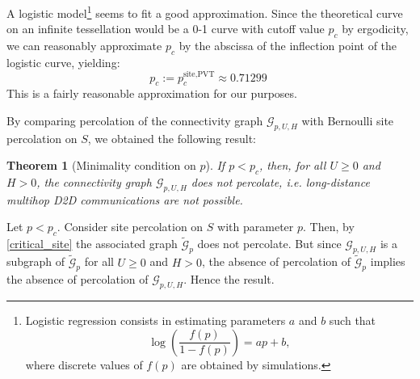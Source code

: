 \documentclass[conference]{IEEEtran}
\newtheorem{theorem}{Theorem}
\begin{document}
A logistic model\footnote{Logistic regression consists in  estimating 
parameters $a$ and $b$ such that 
\begin{equation*}
\log\left (\frac{f(p)}{1-f(p)}\right)=ap+b, 
\end{equation*} where discrete values of $f(p)$ are obtained by simulations.} %
seems to fit a good approximation.
Since the theoretical curve on an infinite tessellation would be a 0-1 curve with cutoff value $p_c$ by ergodicity, we can reasonably approximate $p_c$ by the abscissa of the inflection point of the logistic curve, yielding:   %
\begin{equation}
\label{e.pc}
p_c:=p_{c}^{\text{site,PVT}} \approx 0.71299 \;  %
\end{equation}
This is a fairly reasonable approximation for our purposes.





\indent %
By comparing percolation of the connectivity graph $\mathcal{G}_{p,U,H}$ with Bernoulli site percolation on $S$, we obtained the following result: \\
\begin{theorem}[Minimality condition on $p$] \label{minimality_theorem} If %
$p<p_c$, then, for all $U \geq 0$ and $H>0$, the connectivity graph $\mathcal{G}_{p,U,H}$ does not percolate, i.e. long-distance multihop D2D communications are not possible.
\end{theorem}
\begin{IEEEproof} 
Let $p < p_c$.
Consider site percolation on $S$ with parameter $p$. Then, by \eqref{critical_site} the associated graph $\tilde{\mathcal{G}}_{p}$ does not percolate. But since $\mathcal{G}_{p,U,H}$ is a subgraph of $\tilde{\mathcal{G}}_{p}$ for all $U \geq 0$ and $H>0$, the absence of percolation of $\tilde{\mathcal{G}}_{p}$ implies the absence of percolation of $\mathcal{G}_{p,U,H}$. Hence the result.
\end{IEEEproof}
\vspace{\baselineskip}
\end{document}
